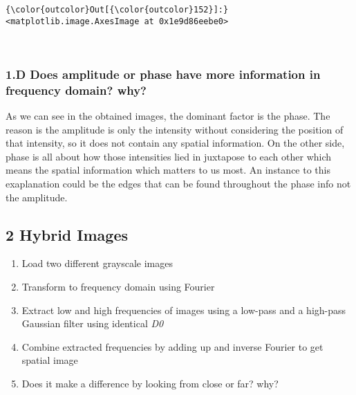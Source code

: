 \documentclass[11pt]{article}
\providecommand{\tightlist}{%
      \setlength{\itemsep}{0pt}\setlength{\parskip}{0pt}}
\begin{document}
\begin{Verbatim}[commandchars=\\\{\}]
{\color{outcolor}Out[{\color{outcolor}152}]:} <matplotlib.image.AxesImage at 0x1e9d86eebe0>
\end{Verbatim}
            
    \begin{center}
    \end{center}
    { \hspace*{\fill} \\}
    
    \hypertarget{d-does-amplitude-or-phase-have-more-information-in-frequency-domain-why}{%
\subsubsection{1.D Does amplitude or phase have more information in
frequency domain?
why?}\label{d-does-amplitude-or-phase-have-more-information-in-frequency-domain-why}}

    As we can see in the obtained images, the dominant factor is the phase.
The reason is the amplitude is only the intensity without considering
the position of that intensity, so it does not contain any spatial
information. On the other side, phase is all about how those intensities
lied in juxtapose to each other which means the spatial information
which matters to us most. An instance to this exaplanation could be the
edges that can be found throughout the phase info not the amplitude.

    \hypertarget{hybrid-images}{%
\subsection{2 Hybrid Images}\label{hybrid-images}}

\begin{enumerate}
\def\labelenumi{\arabic{enumi}.}
\tightlist
\item
  Load two different grayscale images
\item
  Transform to frequency domain using Fourier
\item
  Extract low and high frequencies of images using a low-pass and a
  high-pass Gaussian filter using identical \emph{D0}
\item
  Combine extracted frequencies by adding up and inverse Fourier to get
  spatial image
\item
  Does it make a difference by looking from close or far? why?
\end{enumerate}
\end{document}
